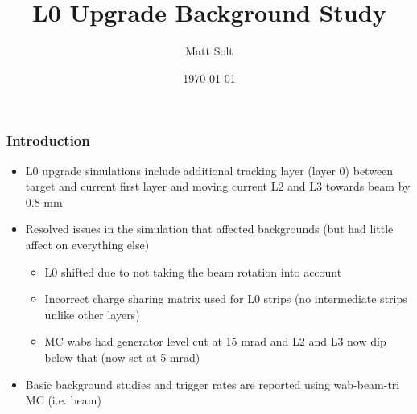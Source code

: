 \documentclass{beamer}
\title[L0 Backgrounds]{L0 Upgrade Background Study} %
\author{Matt Solt} %
\institute[Stanford] %
{
SLAC National Accelerator Laboratory \\ %
\medskip
\textit{mrsolt@slac.stanford.edu} %
}
\date{\today} %
\begin{document}
\begin{frame}
\titlepage %
\end{frame}




\begin{frame}
\frametitle{Introduction}
\begin{itemize}
\item L0 upgrade simulations include additional tracking layer (layer 0) between target and current first layer and moving current L2 and L3 towards beam by 0.8 mm
\item Resolved issues in the simulation that affected backgrounds (but had little affect on everything else)
\begin{itemize}
\item L0 shifted due to not taking the beam rotation into account
\item Incorrect charge sharing matrix used for L0 strips (no intermediate strips unlike other layers)
\item MC wabs had generator level cut at 15 mrad and L2 and L3 now dip below that (now set at 5 mrad)
\end{itemize}
\item Basic background studies and trigger rates are reported using wab-beam-tri MC (i.e. beam)
\end{itemize}

\end{frame}
\end{document}
